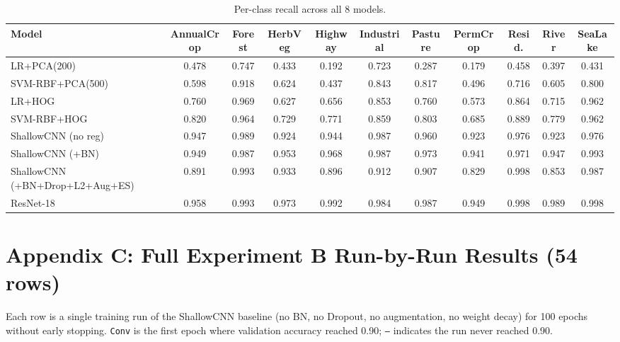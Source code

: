 \documentclass[10pt,letterpaper]{article}
\begin{document}
\begin{table}[h]
\centering
\tiny
\caption{Per-class recall across all 8 models.}
\label{tab:appB-rc}
\begin{tabular}{lcccccccccc}
\toprule
\textbf{Model} & \textbf{AnnualCrop} & \textbf{Forest} & \textbf{HerbVeg} & \textbf{Highway} & \textbf{Industrial} & \textbf{Pasture} & \textbf{PermCrop} & \textbf{Resid.} & \textbf{River} & \textbf{SeaLake} \\
\midrule
LR+PCA(200) & 0.478 & 0.747 & 0.433 & 0.192 & 0.723 & 0.287 & 0.179 & 0.458 & 0.397 & 0.431 \\
SVM-RBF+PCA(500) & 0.598 & 0.918 & 0.624 & 0.437 & 0.843 & 0.817 & 0.496 & 0.716 & 0.605 & 0.800 \\
LR+HOG & 0.760 & 0.969 & 0.627 & 0.656 & 0.853 & 0.760 & 0.573 & 0.864 & 0.715 & 0.962 \\
SVM-RBF+HOG & 0.820 & 0.964 & 0.729 & 0.771 & 0.859 & 0.803 & 0.685 & 0.889 & 0.779 & 0.962 \\
ShallowCNN (no reg) & 0.947 & 0.989 & 0.924 & 0.944 & 0.987 & 0.960 & 0.923 & 0.976 & 0.923 & 0.976 \\
ShallowCNN (+BN) & 0.949 & 0.987 & 0.953 & 0.968 & 0.987 & 0.973 & 0.941 & 0.971 & 0.947 & 0.993 \\
ShallowCNN (+BN+Drop+L2+Aug+ES) & 0.891 & 0.993 & 0.933 & 0.896 & 0.912 & 0.907 & 0.829 & 0.998 & 0.853 & 0.987 \\
ResNet-18 & 0.958 & 0.993 & 0.973 & 0.992 & 0.984 & 0.987 & 0.949 & 0.998 & 0.989 & 0.998 \\
\bottomrule
\end{tabular}
\end{table}

\section{Appendix C: Full Experiment B Run-by-Run Results (54 rows)}
Each row is a single training run of the ShallowCNN baseline (no BN, no Dropout, no augmentation, no weight decay) for 100 epochs without early stopping. \texttt{Conv} is the first epoch where validation accuracy reached 0.90; \texttt{---} indicates the run never reached 0.90.
\end{document}

